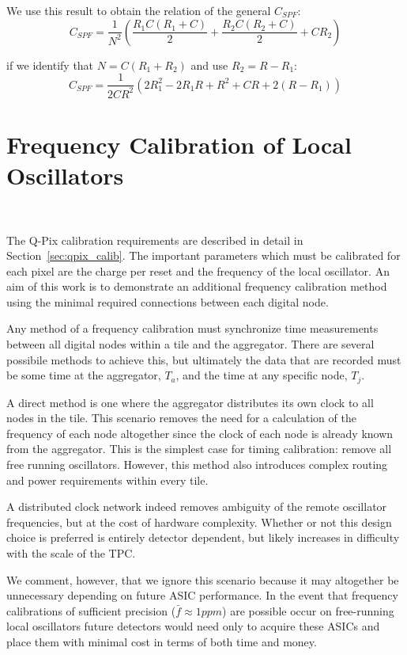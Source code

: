We use this result to obtain the relation of the general $C_{SPF}$:
\begin{equation}
  C_{SPF} = \frac{1}{N^{2}}(\frac{R_{1}C(R_{1}+C)}{2} + \frac{R_{2}C(R_{2}+C)}{2} + CR_{2})
\end{equation}

if we identify that $N = C(R_{1}+R_{2})$ and use $R_{2} = R - R_{1}$:
\begin{equation}
  C_{SPF} = \frac{1}{2CR^{2}}(2R_{1}^{2}-2R_{1}R+R^{2}+CR+2(R-R_{1}))
\end{equation}


\section{Frequency Calibration of Local Oscillators}~\label{sec:calib}

The Q-Pix calibration requirements are described in detail in Section~\ref{sec:qpix_calib}.
The important parameters which must be calibrated for each pixel are the charge per reset and the frequency of the local oscillator.
An aim of this work is to demonstrate an additional frequency calibration method using the minimal required connections between each digital node.

Any method of a frequency calibration must synchronize time measurements between all digital nodes within a tile and the aggregator.
There are several possibile methods to achieve this, but ultimately the data that are recorded must be some time at the aggregator, $T_{a}$, and the time at any specific node, $T_{j}$.

A direct method is one where the aggregator distributes its own clock to all nodes in the tile.
This scenario removes the need for a calculation of the frequency of each node altogether since the clock of each node is already known from the aggregator.
This is the simplest case for timing calibration: remove all free running oscillators.
However, this method also introduces complex routing and power requirements within every tile.

A distributed clock network indeed removes ambiguity of the remote oscillator frequencies, but at the cost of hardware complexity.
Whether or not this design choice is preferred is entirely detector dependent, but likely increases in difficulty with the scale of the TPC.

We comment, however, that we ignore this scenario because it may altogether be unnecessary depending on future ASIC performance.
In the event that frequency calibrations of sufficient precision ($\bar{f} \approx 1 ppm$) are possible occur on free-running local oscillators future detectors would need only to acquire these ASICs and place them with minimal cost in terms of both time and money.

